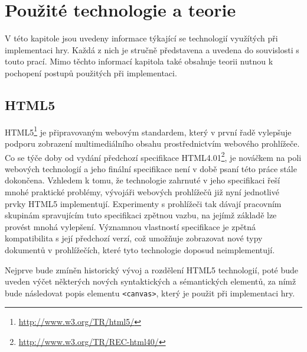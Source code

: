 \chapter{Použité technologie a teorie}
V této kapitole jsou uvedeny informace týkající se technologií využítých při implementaci hry. Každá z nich je stručně představena a uvedena do souvislosti s touto prací. Mimo těchto informací kapitola také obsahuje teorii nutnou k pochopení postupů použitých při implementaci.

\label{chap:teorie}
\section{HTML5}
\label{section:html5}
HTML5\footnote{\url{http://www.w3.org/TR/html5/}} je připravovaným webovým standardem, který v první řadě vylepšuje podporu zobrazení multimediálního obsahu prostřednictvím webového prohlížeče. Co se týče doby od vydání předchozí specifikace HTML4.01\footnote{\url{http://www.w3.org/TR/REC-html40/}}, je nováčkem na poli webových technologií a jeho finální specifikace není v době psaní této práce stále dokončena. Vzhledem k tomu, že technologie  zahrnuté v jeho specifikaci řeší mnohé praktické problémy, vývojáři webových prohlížečů již nyní jednotlivé prvky HTML5 implementují. Experimenty s prohlížeči tak dávají pracovním skupinám spravujícím tuto specifikaci zpětnou vazbu, na jejímž základě lze provést mnohá vylepšení. Významnou vlastností specifikace je zpětná kompatibilita s její předchozí verzí, což umožňuje zobrazovat nové typy dokumentů v prohlížečích, které tyto technologie doposud neimplementují.~\cite{pilgrim2010html5, macdonald2011html5, lubbers2011pro}

Nejprve bude zmíněn historický vývoj a rozdělení HTML5 technologií, poté bude uveden výčet některých nových syntaktických a sémantických elementů, za nímž bude následovat popis elementu \texttt{<canvas>}, který je použit při implementaci hry.

